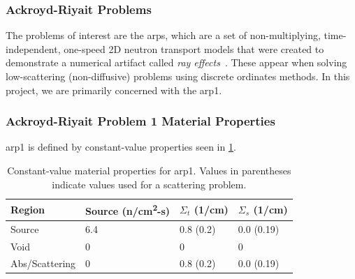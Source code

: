 \begin{frame}
  \frametitle{Ackroyd-Riyait Problems}
  The problems of interest are the \glspl{arp}, which are a set of non-multiplying, time-independent, one-speed 2D neutron transport models that were created to demonstrate a numerical artifact called \textit{ray effects}~\cite{ACKROYD19891}.
  These appear when solving low-scattering (non-diffusive) problems using discrete ordinates methods.
  In this project, we are primarily concerned with the \gls{arp1}.

  
\end{frame}

\begin{frame}
  \frametitle{Ackroyd-Riyait Problem 1 Material Properties}
  \gls{arp1} is defined by constant-value properties seen in \cref{tab:arp1-props}.
  \begin{table}
    \begin{tabular}{llll}
      \toprule
      Region         & Source (n/cm\textsuperscript{2}-s) & $\Sigma_t$ (1/cm) & $\Sigma_s$ (1/cm) \\
      \midrule
      Source         & 6.4                                & 0.8 (0.2)         & 0.0 (0.19)        \\
      Void           & 0                                  & 0                 & 0                 \\
      Abs/Scattering & 0                                  & 0.8 (0.2)         & 0.0 (0.19)        \\
      \bottomrule
    \end{tabular}
    \caption{Constant-value material properties for \gls{arp1}. Values in parentheses indicate values used for a scattering problem.}
    \label{tab:arp1-props}
  \end{table}
\end{frame}
